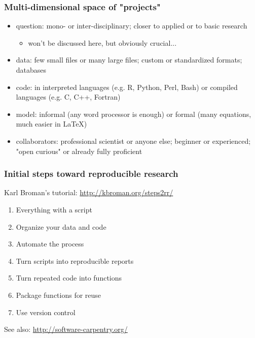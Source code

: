 \documentclass[c]{beamer} %
\begin{document}
\begin{frame}
  \frametitle{Multi-dimensional space of "projects"}
  \begin{itemize}
  \item \alert{question}: mono- or inter-disciplinary; closer to applied or to basic research
    \begin{itemize}
    \item won't be discussed here, but obviously crucial...
    \end{itemize}
    \medskip
    \pause
  \item \alert{data}: few small files or many large files; custom or standardized formats; databases
    \medskip
    \pause
  \item \alert{code}: in interpreted languages (e.g. R, Python, Perl, Bash) or compiled languages (e.g. C, C++, Fortran)
    \medskip
    \pause
  \item \alert{model}: informal (any word processor is enough) or formal (many equations, much easier in LaTeX)
    \medskip
    \pause
  \item \alert{collaborators}: professional scientist or anyone else; beginner or experienced; "open curious" or already fully proficient
  \end{itemize}
\end{frame}

\begin{frame}
  \frametitle{Initial steps toward reproducible research}
  Karl Broman's tutorial: \url{http://kbroman.org/steps2rr/}
  
  \bigskip
  
  \begin{enumerate}
  \item Everything with a script
  \item Organize your data and code
  \item Automate the process
  \item Turn scripts into reproducible reports
  \item Turn repeated code into functions
  \item Package functions for reuse
  \item Use version control
  \end{enumerate}
  
  \bigskip
  \pause
  
  See also: \url{http://software-carpentry.org/}
\end{frame}
\end{document}
